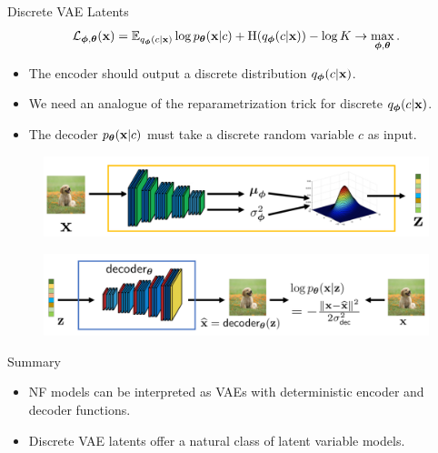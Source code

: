 \documentclass{beamer}
\begin{document}
\begin{frame}{Discrete VAE Latents}
	\[
		\mathcal{L}_{\boldsymbol{\phi}, \boldsymbol{\theta}}(\mathbf{x})  = \mathbb{E}_{q_{\boldsymbol{\phi}}(c| \mathbf{x})} \log p_{\boldsymbol{\theta}}(\mathbf{x}| c) + \mathrm{H}(q_{\boldsymbol{\phi}}(c| \mathbf{x})) - \log K \rightarrow \max_{\boldsymbol{\phi}, \boldsymbol{\theta}}.
	\]
	\eqpause
	\vspace{-0.5cm}
	\begin{itemize}
		\item The encoder should output a discrete distribution $q_{\boldsymbol{\phi}}(c| \mathbf{x})$.
					\item We need an analogue of the reparametrization trick for discrete $q_{\boldsymbol{\phi}}(c| \mathbf{x})$.
		\item The decoder $p_{\boldsymbol{\theta}}(\mathbf{x}| c)$ must take a discrete random variable $c$ as input.
	\end{itemize}
	\begin{figure}[h]
		\centering
		\includegraphics[width=0.7\linewidth]{figs/vae-encoder}
	\end{figure}
	\begin{figure}[h]
		\centering
		\includegraphics[width=0.9\linewidth]{figs/vae-decoder}
	\end{figure}
\end{frame}
\begin{frame}{Summary}
	\begin{itemize}
		\item NF models can be interpreted as VAEs with deterministic encoder and decoder functions.
		\vfill
		\item Discrete VAE latents offer a natural class of latent variable models.
	\end{itemize}
\end{frame}
\end{document}
